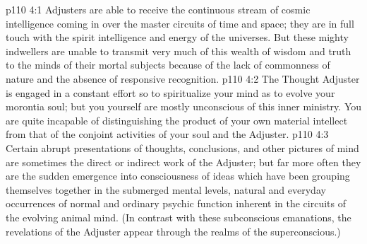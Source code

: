 \vs p110 4:1 Adjusters are able to receive the continuous stream of cosmic intelligence coming in over the master circuits of time and space; they are in full touch with the spirit intelligence and energy of the universes. But these mighty indwellers are unable to transmit very much of this wealth of wisdom and truth to the minds of their mortal subjects because of the lack of commonness of nature and the absence of responsive recognition.
\vs p110 4:2 The Thought Adjuster is engaged in a constant effort so to spiritualize your mind as to evolve your morontia soul; but you yourself are mostly unconscious of this inner ministry. You are quite incapable of distinguishing the product of your own material intellect from that of the conjoint activities of your soul and the Adjuster.
\vs p110 4:3 Certain abrupt presentations of thoughts, conclusions, and other pictures of mind are sometimes the direct or indirect work of the Adjuster; but far more often they are the sudden emergence into consciousness of ideas which have been grouping themselves together in the submerged mental levels, natural and everyday occurrences of normal and ordinary psychic function inherent in the circuits of the evolving animal mind. (In contrast with these subconscious emanations, the revelations of the Adjuster appear through the realms of the superconscious.)
